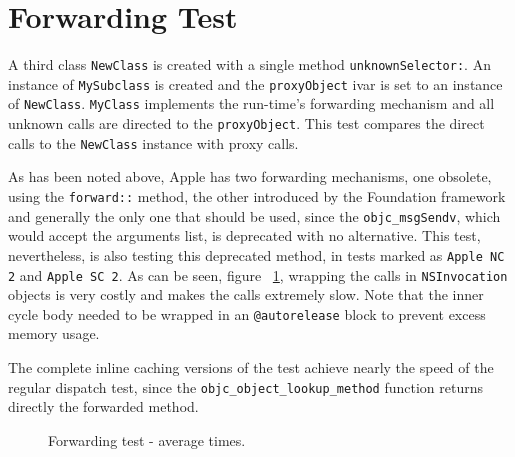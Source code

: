 \section{Forwarding Test}

A third class \verb=NewClass= is created with a single method \verb=unknownSelector:=. An instance of \verb=MySubclass= is created and the \verb=proxyObject= ivar is set to an instance of \verb=NewClass=. \verb=MyClass= implements the run-time's forwarding mechanism and all unknown calls are directed to the \verb=proxyObject=. This test compares the direct calls to the \verb=NewClass= instance with proxy calls.

As has been noted above, Apple has two forwarding mechanisms, one obsolete, using the \verb=forward::= method, the other introduced by the Foundation framework and generally the only one that should be used, since the \verb=objc_msgSendv=, which would accept the arguments list, is deprecated with no alternative. This test, nevertheless, is also testing this deprecated method, in tests marked as \verb=Apple NC 2= and \verb=Apple SC 2=. As can be seen, figure ~\ref{fig:forwarding_test}, wrapping the calls in \verb=NSInvocation= objects is very costly and makes the calls extremely slow. Note that the inner cycle body needed to be wrapped in an \verb=@autorelease= block to prevent excess memory usage.

The complete inline caching versions of the test achieve nearly the speed of the regular dispatch test, since the \verb=objc_object_lookup_method= function returns directly the forwarded method.

\begin{figure}[H]
  \centering{}
  \caption{Forwarding test - average times.}
  \label{fig:forwarding_test}
\end{figure}

